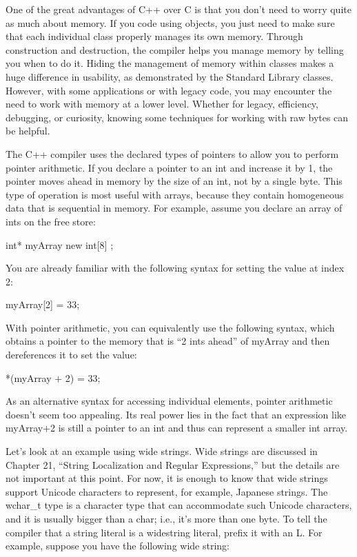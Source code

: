 
One of the great advantages of C++ over C is that you don’t need to worry quite as much about memory. If you code using objects, you just need to make sure that each individual class properly manages its own memory. Through construction and destruction, the compiler helps you manage memory by telling you when to do it. Hiding the management of memory within classes makes a huge difference in usability, as demonstrated by the Standard Library classes. However, with some applications or with legacy code, you may encounter the need to work with memory at a lower level. Whether for legacy, efficiency, debugging, or curiosity, knowing some techniques for working with raw bytes can be helpful.


The C++ compiler uses the declared types of pointers to allow you to perform pointer arithmetic. If you declare a pointer to an int and increase it by 1, the pointer moves ahead in memory by the size of an int, not by a single byte. This type of operation is most useful with arrays, because they contain homogeneous data that is sequential in memory. For example, assume you declare an array of ints on the free store:

\begin{cpp}
int* myArray { new int[8] };
\end{cpp}

You are already familiar with the following syntax for setting the value at index 2:

\begin{cpp}
myArray[2] = 33;
\end{cpp}

With pointer arithmetic, you can equivalently use the following syntax, which obtains a pointer to the memory that is “2 ints ahead” of myArray and then dereferences it to set the value:

\begin{cpp}
*(myArray + 2) = 33;
\end{cpp}

As an alternative syntax for accessing individual elements, pointer arithmetic doesn’t seem too appealing. Its real power lies in the fact that an expression like myArray+2 is still a pointer to an int and thus can represent a smaller int array.

Let’s look at an example using wide strings. Wide strings are discussed in Chapter 21, “String Localization and Regular Expressions,” but the details are not important at this point. For now, it is enough to know that wide strings support Unicode characters to represent, for example, Japanese strings. The wchar\_t type is a character type that can accommodate such Unicode characters, and it is usually bigger than a char; i.e., it’s more than one byte. To tell the compiler that a string literal is a widestring literal, prefix it with an L. For example, suppose you have the following wide string:


